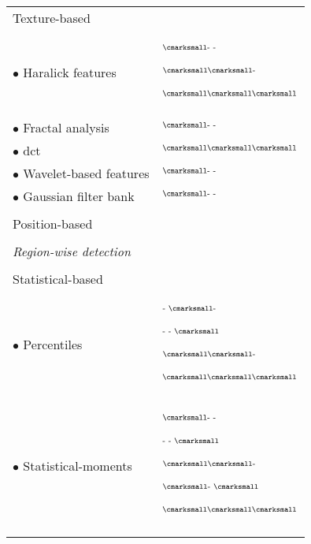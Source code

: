\begin{longtable}{@{}l >{\raggedleft\arraybackslash}X@{}}
  \quad \quad Texture-based & \\
  \quad \quad \quad $\bullet$ Haralick features & $^{\text{{\cmarksmall}- -}}$\cite{Antic2013,Tiwari2009a,Tiwari2010,Tiwari2013,Viswanath2008,Viswanath2009,Viswanath2012}\par $^{\text{{\cmarksmall}{\cmarksmall}-}}$\cite{Viswanath2011}\par $^{\text{{\cmarksmall}{\cmarksmall}{\cmarksmall}}}$\cite{Litjens2012,Niaf2011,Niaf2012} \\
  \quad \quad \quad $\bullet$ Fractal analysis & $^{\text{{\cmarksmall}- -}}$\cite{Lopes2011,Lv2009} \\
  \quad \quad \quad $\bullet$ \acs*{dct} & $^{\text{{\cmarksmall}{\cmarksmall}{\cmarksmall}}}$\cite{Chan2003} \\
  \quad \quad \quad $\bullet$ Wavelet-based features & $^{\text{{\cmarksmall}- -}}$\cite{Viswanath2012} \\
  \quad \quad \quad $\bullet$ Gaussian filter bank & $^{\text{{\cmarksmall}- -}}$\cite{Litjens2014} \\ \\ [-1.5ex]
  \quad \quad Position-based & \cite{Chan2003,Litjens2011,Litjens2012,Litjens2014} \\ \\ [-1.5ex]
  \quad \textit{Region-wise detection} &  \\ \\ [-1.5ex]
  \quad \quad Statistical-based & \\
  \quad \quad \quad $\bullet$ Percentiles & $^{\text{- {\cmarksmall}-}}$\cite{Vos2008a} \par $^{\text{- - {\cmarksmall}}}$\cite{Antic2013,Peng2013}\par $^{\text{{\cmarksmall}{\cmarksmall}-}}$\cite{Vos2010}\par $^{\text{{\cmarksmall}{\cmarksmall}{\cmarksmall}}}$\cite{Litjens2011,Litjens2012,Litjens2014,Niaf2011,Niaf2012,Vos2012} \\
  \quad \quad \quad $\bullet$ Statistical-moments & $^{\text{{\cmarksmall}- -}}$\cite{Ampeliotis2007,Ampeliotis2008,Tiwari2009a,Tiwari2010,Tiwari2013,Viswanath2008,Viswanath2009,Viswanath2012}\par $^{\text{- - {\cmarksmall}}}$\cite{Antic2013}\par $^{\text{{\cmarksmall}{\cmarksmall}-}}$\cite{Viswanath2011}\par $^{\text{{\cmarksmall}- {\cmarksmall}}}$\cite{Peng2013}\par $^{\text{{\cmarksmall}{\cmarksmall}{\cmarksmall}}}$\cite{Litjens2011,Litjens2012,Litjens2014,Niaf2011,Niaf2012} \\ \\ [-1.5ex]

\end{longtable}
